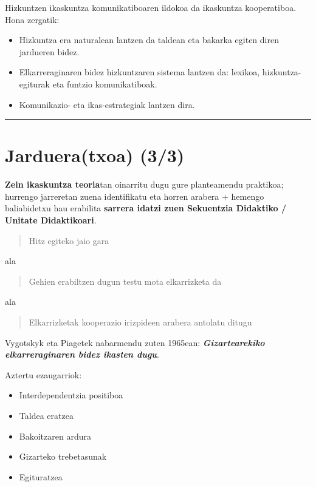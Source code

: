\documentclass[
]{book}
\providecommand{\tightlist}{%
  \setlength{\itemsep}{0pt}\setlength{\parskip}{0pt}}
\begin{document}
Hizkuntzen ikaskuntza komunikatiboaren ildokoa da ikaskuntza kooperatiboa. Hona zergatik:

\begin{itemize}
\tightlist
\item
  Hizkuntza era naturalean lantzen da taldean eta bakarka egiten diren jardueren bidez.
\item
  Elkarreraginaren bidez hizkuntzaren sistema lantzen da: lexikoa, hizkuntza-egiturak eta funtzio komunikatiboak.
\item
  Komunikazio- eta ikas-estrategiak lantzen dira.
\end{itemize}

\begin{center}\rule{0.5\linewidth}{0.5pt}\end{center}

\hypertarget{jardueratxoa-33}{%
\chapter*{Jarduera(txoa) (3/3)}\label{jardueratxoa-33}}

\textbf{Zein ikaskuntza teoria}tan oinarritu dugu gure planteamendu praktikoa; hurrengo jarreretan zuena identifikatu eta horren arabera + hemengo baliabidetxu hau erabilita \textbf{sarrera idatzi zuen Sekuentzia Didaktiko / Unitate Didaktikoari}.

\begin{quote}
Hitz egiteko jaio gara
\end{quote}

ala

\begin{quote}
Gehien erabiltzen dugun testu mota elkarrizketa da
\end{quote}

ala

\begin{quote}
Elkarrizketak kooperazio irizpideen arabera antolatu ditugu
\end{quote}

Vygotskyk eta Piagetek nabarmendu zuten 1965ean: \textbf{\emph{Gizartearekiko elkarreraginaren bidez ikasten dugu}}.

Aztertu ezaugarriok:

\begin{itemize}
\tightlist
\item
  Interdependentzia positiboa
\item
  Taldea eratzea
\item
  Bakoitzaren ardura
\item
  Gizarteko trebetasunak
\item
  Egituratzea
\end{itemize}
\end{document}
